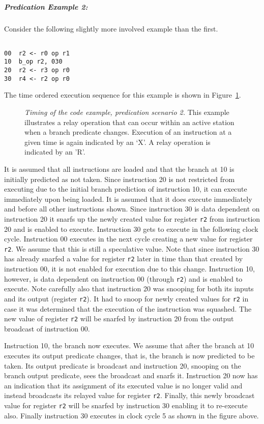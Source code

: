 \documentclass[10pt,dvips]{article}
\begin{document}
\subparagraph{Predication Example 2: }
Consider the following slightly more involved example than the first.

\begin{verbatim}

00	r2 <- r0 op r1
10	b_op r2, 030
20	r2 <- r3 op r0
30	r4 <- r2 op r0

\end{verbatim}

The time ordered execution sequence for this example is shown in
Figure~\ref{pex2}.

\begin{figure}
\centering
{}
\caption{{\em Timing of the code example, predication scenario 2.}
This example illustrates a relay operation that
can occur within an active station when a branch
predicate changes.
Execution of an instruction at a given time is
again indicated by an `X'.  A relay operation is indicated by an 'R'.}
\label{pex2}
\end{figure}

It is assumed that all instructions are loaded and that
the branch at 10 is initially predicted as not taken.
Since instruction 20 is not restricted from executing
due to the initial branch prediction of instruction 10,
it can execute immediately upon being loaded.
It is assumed that it does execute immediately and before
all other instructions shown.
Since instruction 30 is data dependent on instruction 20
it snarfs up the
newly created value for register
{\tt r2}
from instruction 20 and is enabled to execute.
Instruction 30 gets to execute in the following clock cycle.
Instruction 00 executes in the next cycle creating a new value for
register
{\tt r2}.
We assume that this is still a speculative value.
Note that since instruction 30 has already snarfed a value for
register
{\tt r2}
later in time than that created by instruction 00, it is not
enabled for execution due to this change.
Instruction 10, however, is data dependent on instruction 00 (through
{\tt r2})
and is enabled to execute.  
Note carefully also that instruction 20 was snooping for both
its inputs and its output (register
{\tt r2}).  It had to snoop for newly created values for
{\tt r2} in case it was determined that the execution of the instruction
was squashed.  The new value of
register
{\tt r2} will be snarfed by instruction 20 from 
the output broadcast of
instruction 00.

Instruction 10, the branch now executes.
We assume that after the branch at 10 executes its output
predicate changes, that is, the branch is now predicted to
be taken.  Its output predicate is broadcast and
instruction 20, snooping on the branch output predicate,
sees the broadcast and snarfs it.  Instruction 20 now has
an indication that its assignment of its executed value
is no longer valid and instead broadcasts its relayed value
for register
{\tt r2}.
Finally, this newly broadcast value for
register
{\tt r2} will
be snarfed by instruction 30 enabling it to re-execute also.
Finally instruction 30 executes in clock cycle 5 as shown in the
figure above.
\end{document}
